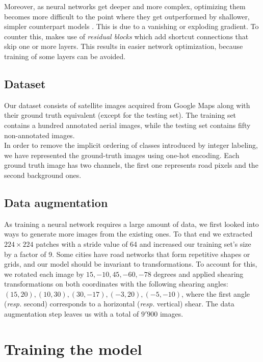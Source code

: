 \documentclass[10pt,conference,compsocconf]{IEEEtran}
\begin{document}
Moreover, as neural networks get deeper and more complex, optimizing them becomes more difficult to the point where they get outperformed by shallower, simpler counterpart models \cite{deep_residual_nn}. This is due to a vanishing or exploding gradient. To counter this, \cite{deep_residual_nn} makes use of \textit{residual blocks} which add shortcut connections that skip one or more layers. This results in easier network optimization, because training of some layers can be avoided.

\subsection{Dataset}

Our dataset consists of satellite images acquired from Google Maps along with their ground truth equivalent (except for the testing set). The training set contains a hundred annotated aerial images, while the testing set contains fifty non-annotated images. \\

In order to remove the implicit ordering of classes introduced by integer labeling, we have represented the ground-truth images using one-hot encoding. Each ground truth image has two channels, the first one represents road pixels and the second background ones.

\subsection{Data augmentation}

As training a neural network requires a large amount of data, we first looked into ways to generate more images from the existing ones. To that end we extracted $224 \times 224$ patches with a stride value of 64 and increased our training set's size by a factor of 9. Some cities have road networks that form repetitive shapes or grids, and our model should be invariant to transformations. To account for this, we rotated each image by $15, -10, 45, -60, -78$ degrees and applied shearing transformations on both coordinates with the following shearing angles: $(15, 20), (10, 30), (30, -17), (-3, 20), (-5, -10)$, where the first angle (\textit{resp.} second) corresponds to a horizontal (\textit{resp.} vertical) shear. The data augmentation step leaves us with a total of $9'900$ images.

\section{Training the model}
\end{document}
